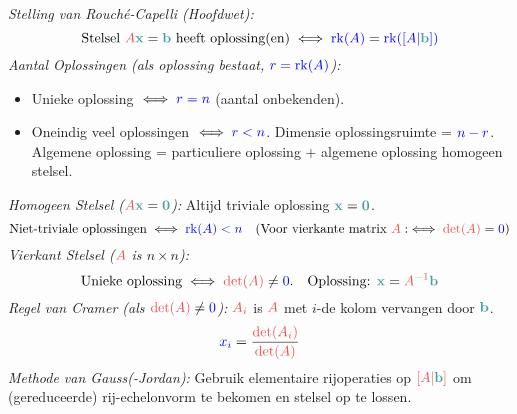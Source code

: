 \documentclass[12pt]{article}
\renewcommand{\vec}[1]{\textcolor{vectorTeal}{\mathbf{#1}}}
\newcommand{\scalar}[1]{\textcolor{scalarBrightBlue}{#1}}
\newcommand{\mat}[1]{\textcolor{matrixSoftRed}{#1}}
\DeclareMathOperator{\rk}{rk}
\begin{document}
\textit{Stelling van Rouché-Capelli (Hoofdwet):}
\[
\text{Stelsel } \mat{A} \vec{x} = \vec{b} \text{ heeft oplossing(en)} \iff \scalar{\rk(A)} = \scalar{\rk([A | \vec{b}])}
\]
\textit{Aantal Oplossingen (als oplossing bestaat, $\scalar{r = \rk(A)}$):}
\begin{itemize}
    \item Unieke oplossing $\iff \scalar{r = n}$ (aantal onbekenden).
    \item Oneindig veel oplossingen $\iff \scalar{r < n}$. Dimensie oplossingsruimte = $\scalar{n - r}$. Algemene oplossing = particuliere oplossing + algemene oplossing homogeen stelsel.
\end{itemize}
\textit{Homogeen Stelsel ($\mat{A} \vec{x} = \vec{0}$):} Altijd triviale oplossing $\vec{x} = \vec{0}$.
\[
\text{Niet-triviale oplossingen} \iff \scalar{\rk(A) < n} \quad (\text{Voor vierkante matrix } \mat{A}: \iff \mat{\det(A)} = \scalar{0})
\]
\textit{Vierkant Stelsel ($\mat{A}$ is $n \times n$):}
\[
\text{Unieke oplossing} \iff \mat{\det(A)} \neq \scalar{0}. \quad \text{Oplossing: } \vec{x} = \mat{A^{-1}} \vec{b}
\]
\textit{Regel van Cramer (als $\mat{\det(A)} \neq \scalar{0}$):} $\mat{A_i}$ is $\mat{A}$ met $i$-de kolom vervangen door $\vec{b}$.
\[
\scalar{x_i} = \frac{\mat{\det(A_i)}}{\mat{\det(A)}}
\]
\textit{Methode van Gauss(-Jordan):} Gebruik elementaire rijoperaties op $\mat{[A|\vec{b}]}$ om (gereduceerde) rij-echelonvorm te bekomen en stelsel op te lossen.
\end{document}

